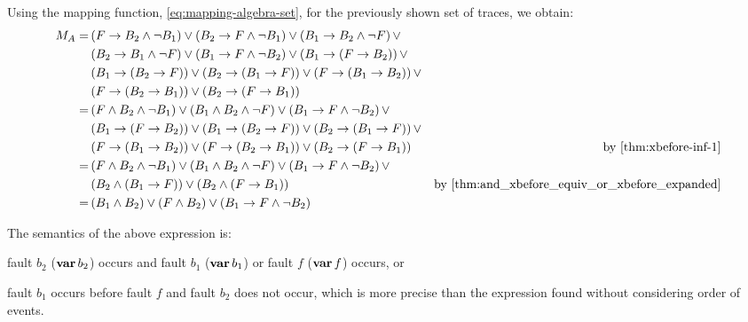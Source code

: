 \documentclass[12pt,openright,twoside,a4paper,oldfontcommands,english,brazil,final]{abntex2}
\theoremstyle{theo}
\def\varop{\ensuremath\operatorname{\mathbf{var}}}
\newcommand{\var}[1]{\ensuremath\varop #1}
\def\xbeforeop{\ensuremath\rightarrow}
\newcommand{\xbefore}[2]{\ensuremath #1 \xbeforeop #2 }
\begin{document}
Using the mapping function, \cref{eq:mapping-algebra-set}, for the previously shown set of traces, we obtain:
%
\begin{align}
M_A = & 
  \left(\xbefore{F}{B_2} \land \lnot B_1\right) \lor
  \left(\xbefore{B_2}{F} \land \lnot B_1\right) \lor
  \left(\xbefore{B_1}{B_2} \land \lnot F\right) \lor \nonumber \\
  & \left(\xbefore{B_2}{B_1} \land \lnot F\right) \lor
  \left(\xbefore{B_1}{F} \land \lnot B_2\right) \lor
  \left(\xbefore{B_1}{\left(\xbefore{F}{B_2}\right)}\right) \lor \nonumber \\
  &\left(\xbefore{B_1}{\left(\xbefore{B_2}{F}\right)}\right) \lor
  \left(\xbefore{B_2}{\left(\xbefore{B_1}{F}\right)}\right) \lor
  \left(\xbefore{F}{\left(\xbefore{B_1}{B_2}\right)}\right) \lor \nonumber \\
  &\left(\xbefore{F}{\left(\xbefore{B_2}{B_1}\right)}\right) \lor
  \left(\xbefore{B_2}{\left(\xbefore{F}{B_1}\right)}\right) \nonumber \\
%
  = & \left(F \land B_2 \land \lnot B_1\right) \lor 
  \left(B_1 \land B_2 \land \lnot F\right) \lor
  \left(\xbefore{B_1}{F} \land \lnot B_2\right) \lor \nonumber \\
  & \left(\xbefore{B_1}{\left(\xbefore{F}{B_2}\right)}\right) \lor 
  \left(\xbefore{B_1}{\left(\xbefore{B_2}{F}\right)}\right) \lor
  \left(\xbefore{B_2}{\left(\xbefore{B_1}{F}\right)}\right) \lor \nonumber \\
  & \left(\xbefore{F}{\left(\xbefore{B_1}{B_2}\right)}\right) \lor 
  \left(\xbefore{F}{\left(\xbefore{B_2}{B_1}\right)}\right) \lor
  \left(\xbefore{B_2}{\left(\xbefore{F}{B_1}\right)}\right) 
  & \text{by \cref{thm:xbefore-inf-1}} \nonumber \\
%
  = & \left(F \land B_2 \land \lnot B_1\right) \lor 
  \left(B_1 \land B_2 \land \lnot F\right) \lor
  \left(\xbefore{B_1}{F} \land \lnot B_2\right) \lor \nonumber \\
  & \left(B_2 \land \left(\xbefore{B_1}{F}\right)\right) \lor
  \left(B_2 \land \left(\xbefore{F}{B_1}\right)\right)
  & \text{by \cref{thm:and_xbefore_equiv_or_xbefore_expanded}} \nonumber \\
%
  = &\left(B_1 \land B_2\right) \lor \left(F \land B_2\right) \lor
    \left(\xbefore{B_1}{F} \land \lnot B_2\right) \label{eq:m-algebra}
\end{align}

The semantics of the above expression is:
\begin{alineasinline}
  \item fault $b_2$ ($\var{b_2}$) occurs and fault $b_1$ ($\var{b_1}$) or fault $f$ ($\var{f}$) occurs, or
  \item fault $b_1$ occurs before fault $f$ and fault $b_2$ does not occur, which is more precise than the expression found without considering order of events.
\end{alineasinline}
\end{document}
